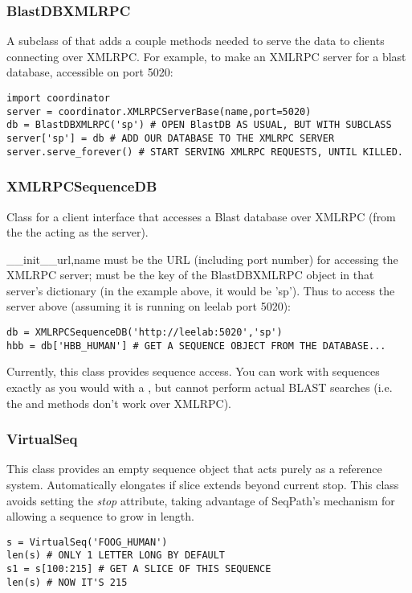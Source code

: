 \documentclass{howto}
\begin{document}
\subsubsection{BlastDBXMLRPC}
A subclass of  that adds a couple methods needed to serve
the data to clients connecting over XMLRPC.  For example, to make an XMLRPC
server for a blast database, accessible on port 5020:
\begin{verbatim}
import coordinator
server = coordinator.XMLRPCServerBase(name,port=5020)
db = BlastDBXMLRPC('sp') # OPEN BlastDB AS USUAL, BUT WITH SUBCLASS
server['sp'] = db # ADD OUR DATABASE TO THE XMLRPC SERVER
server.serve_forever() # START SERVING XMLRPC REQUESTS, UNTIL KILLED.
\end{verbatim}

\subsubsection{XMLRPCSequenceDB}
Class for a client interface that accesses a Blast database over
XMLRPC (from the the  acting as the server).
\begin{funcdesc}{__init__}{url,name}
   must be the URL (including port number) for accessing the 
  XMLRPC server;  must be the key of the BlastDBXMLRPC object
  in that server's dictionary (in the example above, it would be 'sp').
  Thus to access the server above (assuming it is running on leelab port 5020):
\begin{verbatim}
db = XMLRPCSequenceDB('http://leelab:5020','sp')
hbb = db['HBB_HUMAN'] # GET A SEQUENCE OBJECT FROM THE DATABASE...
\end{verbatim}
\end{funcdesc}
Currently, this class provides sequence access.  You can work with sequences
exactly as you would with a , but cannot perform actual BLAST searches
(i.e. the  and  methods don't work over XMLRPC).

\subsubsection{VirtualSeq}
This class provides an empty sequence object that
acts purely as a reference system.
Automatically elongates if slice extends beyond current stop.
This class avoids setting the {\em stop} attribute, taking advantage
of SeqPath's mechanism for allowing a sequence to grow in length.
\begin{verbatim}
s = VirtualSeq('FOOG_HUMAN')
len(s) # ONLY 1 LETTER LONG BY DEFAULT
s1 = s[100:215] # GET A SLICE OF THIS SEQUENCE
len(s) # NOW IT'S 215
\end{verbatim}
\end{document}
